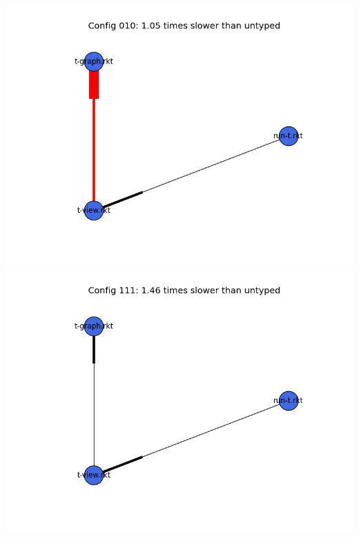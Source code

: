 \documentclass{article}
\begin{document}
\begin{itemize}
\includegraphics[width=\textwidth]{mbta-stressfree-module-graph-010.png}
\includegraphics[width=\textwidth]{mbta-stressfree-module-graph-111.png}
\end{itemize}
\end{document}
